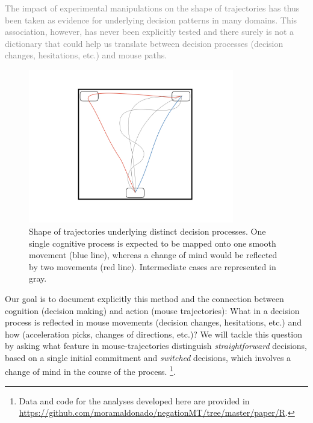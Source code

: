 \documentclass[draft]{article}
\newcommand{\changeEC}[2]{{\footnotesize\textcolor{gray}{#1}}\textcolor{blue}{#2}}
\newcommand{\nbEC}[1]{{\leavevmode\color{blue}{\scriptsize#1}}}
\begin{document}
\changeEC{The impact of experimental manipulations on the shape of trajectories has thus been taken as evidence for underlying decision patterns in many domains. This association, however, has never been explicitly tested and there surely is not a dictionary that could help us translate between decision processes (decision changes, hesitations, etc.) and mouse paths.}{}


\begin{figure}[h]
\centering
\includegraphics[width=0.8\textwidth]{trajectories.jpeg}
\caption{Shape of trajectories underlying distinct decision processes. One single cognitive process is expected to be mapped onto one smooth movement (blue line), whereas a change of mind would be reflected by two movements (red line). \nbEC{not sure about this use of the word "movement"} Intermediate cases are represented in gray.} \label{fig:scheme.traj}
\end{figure}

Our goal is to document explicitly this method and the connection between cognition (decision making) and action (mouse trajectories): What in a decision process is reflected in mouse movements (decision changes, hesitations, etc.) and how (acceleration picks, changes of directions, etc.)?
We will tackle this question by asking what feature in mouse-trajectories distinguish \emph{straightforward} decisions, based on a single initial commitment and \emph{switched} decisions, which involves a change of mind in the course of the process.%
\footnote{Data and code for the analyses developed here are provided in \url{https://github.com/moramaldonado/negationMT/tree/master/paper/R}.\nbEC{This footnote does not belong here}}. 
\end{document}
